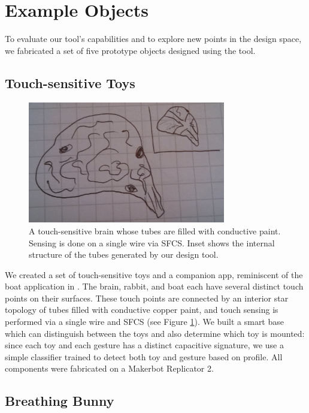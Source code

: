 \section{Example Objects}

To evaluate our tool's capabilities and to explore new points in the design space, we fabricated a set of five prototype objects designed using the tool.

\subsection{Touch-sensitive Toys}

\begin{figure}[h]
\centering
    \includegraphics[width=3.4in]{figures/placeholder/brain.jpg}
\caption{A touch-sensitive brain whose tubes are filled with conductive paint.  Sensing is done on a single wire via SFCS.  Inset shows the internal structure of the tubes generated by our design tool.}
\label{fig:toys}
\end{figure}

We created a set of touch-sensitive toys and a companion app, reminiscent of the boat application in \cite{Harrison-acoustic}.  The brain, rabbit, and boat each have several distinct touch points on their surfaces.  These touch points are connected by an interior star topology of tubes filled with conductive copper paint, and touch sensing is performed via a single wire and SFCS (see Figure \ref{fig:toys}).  We built a smart base which can distinguish between the toys and also determine which toy is mounted: since each toy and each gesture has a distinct capacitive signature, we use a simple classifier trained to detect both toy and gesture based on profile.  All components were fabricated on a Makerbot Replicator 2.

\subsection{Breathing Bunny}

